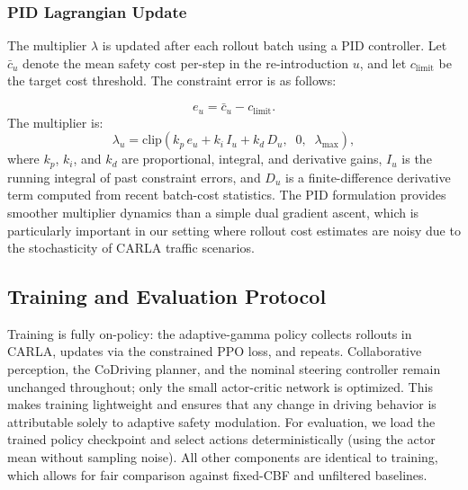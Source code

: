\subsubsection{PID Lagrangian Update}

The multiplier $\lambda$ is updated after each rollout batch using a PID controller. Let $\bar{c}_u$ denote the mean safety cost per-step in the re-introduction $u$, and let $c_{\text{limit}}$ be the target cost threshold. The constraint error is as follows:

\begin{equation}
e_u = \bar{c}_u - c_{\text{limit}}.
\end{equation}
The multiplier is:
\begin{equation}
\lambda_u = \text{clip}\!\left(k_p\,e_u + k_i\,I_u + k_d\,D_u,\;\; 0,\;\; \lambda_{\max}\right),
\end{equation}
where $k_p$, $k_i$, and $k_d$ are proportional, integral, and derivative gains, $I_u$ is the running integral of past constraint errors, and $D_u$ is a finite-difference derivative term computed from recent batch-cost statistics.
The PID formulation provides smoother multiplier dynamics than a simple dual gradient ascent, which is particularly important in our setting where rollout cost estimates are noisy due to the stochasticity of CARLA traffic scenarios.



\subsection{Training and Evaluation Protocol}

Training is fully on-policy: the adaptive-gamma policy collects rollouts in CARLA, updates via the constrained PPO loss, and repeats. Collaborative perception, the CoDriving planner, and the nominal steering controller remain unchanged throughout; only the small actor-critic network is optimized. This makes training lightweight and ensures that any change in driving behavior is attributable solely to adaptive safety modulation. For evaluation, we load the trained policy checkpoint and select actions deterministically (using the actor mean without sampling noise). All other components are identical to training, which allows for fair comparison against fixed-CBF and unfiltered baselines.
